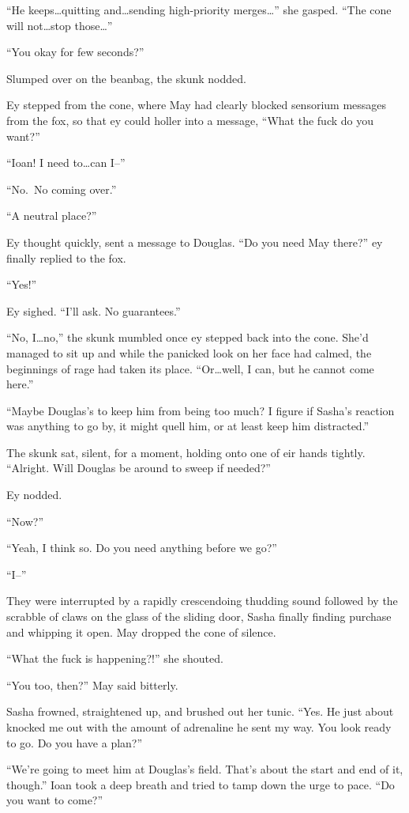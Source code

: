 ``He keeps\ldots quitting and\ldots sending high-priority merges\ldots{}'' she gasped. ``The cone will not\ldots stop those\ldots{}''

``You okay for few seconds?''

Slumped over on the beanbag, the skunk nodded.

Ey stepped from the cone, where May had clearly blocked sensorium messages from the fox, so that ey could holler into a message, ``What the fuck do you want?''

``Ioan! I need to\ldots can I--''

``No.~No coming over.''

``A neutral place?''

Ey thought quickly, sent a message to Douglas. ``Do you need May there?'' ey finally replied to the fox.

``Yes!''

Ey sighed. ``I'll ask. No guarantees.''

``No, I\ldots no,'' the skunk mumbled once ey stepped back into the cone. She'd managed to sit up and while the panicked look on her face had calmed, the beginnings of rage had taken its place. ``Or\ldots well, I can, but he cannot come here.''

``Maybe Douglas's to keep him from being too much? I figure if Sasha's reaction was anything to go by, it might quell him, or at least keep him distracted.''

The skunk sat, silent, for a moment, holding onto one of eir hands tightly. ``Alright. Will Douglas be around to sweep if needed?''

Ey nodded.

``Now?''

``Yeah, I think so. Do you need anything before we go?''

``I--''

They were interrupted by a rapidly crescendoing thudding sound followed by the scrabble of claws on the glass of the sliding door, Sasha finally finding purchase and whipping it open. May dropped the cone of silence.

``What the fuck is happening?!'' she shouted.

``You too, then?'' May said bitterly.

Sasha frowned, straightened up, and brushed out her tunic. ``Yes. He just about knocked me out with the amount of adrenaline he sent my way. You look ready to go. Do you have a plan?''

``We're going to meet him at Douglas's field. That's about the start and end of it, though.'' Ioan took a deep breath and tried to tamp down the urge to pace. ``Do you want to come?''

